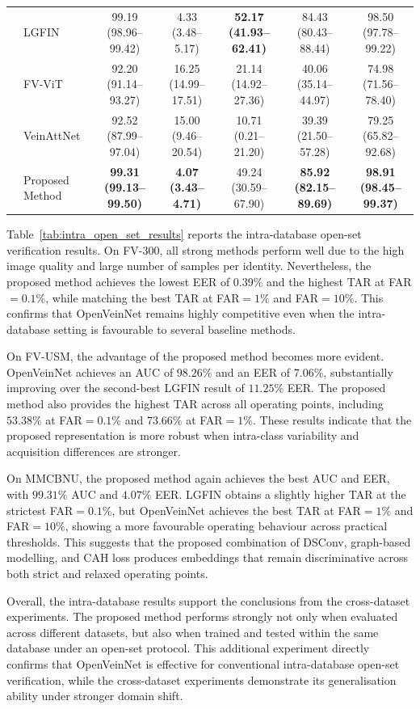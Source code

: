 \documentclass[10pt,journal,compsoc]{IEEEtran}
\begin{document}
\begin{table}[ht!]
{\begin{tabular}{llccccc}
& LGFIN & 99.19 (98.96--99.42) & 4.33 (3.48--5.17) & \textbf{52.17 (41.93--62.41)} & 84.43 (80.43--88.44) & 98.50 (97.78--99.22) \\
& FV-ViT & 92.20 (91.14--93.27) & 16.25 (14.99--17.51) & 21.14 (14.92--27.36) & 40.06 (35.14--44.97) & 74.98 (71.56--78.40) \\
& VeinAttNet & 92.52 (87.99--97.04) & 15.00 (9.46--20.54) & 10.71 (0.21--21.20) & 39.39 (21.50--57.28) & 79.25 (65.82--92.68) \\
& Proposed Method & \textbf{99.31 (99.13--99.50)} & \textbf{4.07 (3.43--4.71)} & 49.24 (30.59--67.90) & \textbf{85.92 (82.15--89.69)} & \textbf{98.91 (98.45--99.37)} \\
\hline
\end{tabular}}
\end{table}

Table~\ref{tab:intra_open_set_results} reports the intra-database open-set verification results. On FV-300, all strong methods perform well due to the high image quality and large number of samples per identity. Nevertheless, the proposed method achieves the lowest EER of $0.39\%$ and the highest TAR at FAR$=0.1\%$, while matching the best TAR at FAR$=1\%$ and FAR$=10\%$. This confirms that OpenVeinNet remains highly competitive even when the intra-database setting is favourable to several baseline methods.

On FV-USM, the advantage of the proposed method becomes more evident. OpenVeinNet achieves an AUC of $98.26\%$ and an EER of $7.06\%$, substantially improving over the second-best LGFIN result of $11.25\%$ EER. The proposed method also provides the highest TAR across all operating points, including $53.38\%$ at FAR$=0.1\%$ and $73.66\%$ at FAR$=1\%$. These results indicate that the proposed representation is more robust when intra-class variability and acquisition differences are stronger.

On MMCBNU, the proposed method again achieves the best AUC and EER, with $99.31\%$ AUC and $4.07\%$ EER. LGFIN obtains a slightly higher TAR at the strictest FAR$=0.1\%$, but OpenVeinNet achieves the best TAR at FAR$=1\%$ and FAR$=10\%$, showing a more favourable operating behaviour across practical thresholds. This suggests that the proposed combination of DSConv, graph-based modelling, and CAH loss produces embeddings that remain discriminative across both strict and relaxed operating points.

Overall, the intra-database results support the conclusions from the cross-dataset experiments. The proposed method performs strongly not only when evaluated across different datasets, but also when trained and tested within the same database under an open-set protocol. This additional experiment directly confirms that OpenVeinNet is effective for conventional intra-database open-set verification, while the cross-dataset experiments demonstrate its generalisation ability under stronger domain shift.
\end{document}
